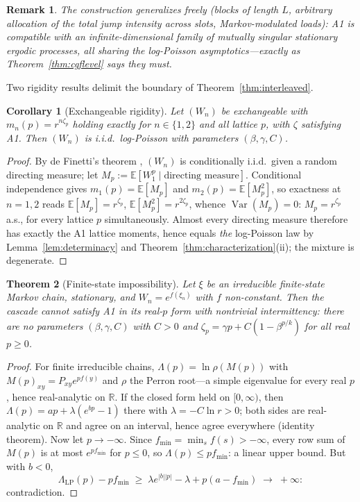 \documentclass[pdflatex,sn-mathphys-num]{sn-jnl}
\theoremstyle{thmstyleone}
\newtheorem{theorem}{Theorem}
\newtheorem{corollary}[theorem]{Corollary}
\theoremstyle{thmstyletwo}
\newtheorem*{remark}{Remark}
\theoremstyle{thmstylethree}
\DeclareMathOperator{\Var}{Var}
\begin{document}
\begin{remark}
The construction generalizes freely (blocks of length $L$, arbitrary
allocation of the total jump intensity across slots,
Markov-modulated loads): A1 is compatible with an
infinite-dimensional family of mutually singular stationary ergodic
processes, all sharing the log-Poisson asymptotics---exactly as
Theorem~\ref{thm:cgflevel} says they must.
\end{remark}

Two rigidity results delimit the boundary of
Theorem~\ref{thm:interleaved}.

\begin{corollary}[Exchangeable rigidity]\label{cor:exch}
Let $(W_n)$ be exchangeable with $m_n(p) = r^{n\zeta_p}$ holding
exactly for $n \in \{1,2\}$ and all lattice $p$, with $\zeta$
satisfying A1.  Then $(W_n)$ is i.i.d.\ log-Poisson with parameters
$(\beta, \gamma, C)$.
\end{corollary}

\begin{proof}
By de Finetti's theorem \cite{Kal02}, $(W_n)$ is conditionally
i.i.d.\ given a random directing measure; let $M_p :=
\mathbb{E}[W_1^p \mid \text{directing measure}]$.  Conditional
independence gives $m_1(p) = \mathbb{E}[M_p]$ and $m_2(p) =
\mathbb{E}[M_p^2]$, so exactness at $n = 1,2$ reads
$\mathbb{E}[M_p] = r^{\zeta_p}$, $\mathbb{E}[M_p^2] =
r^{2\zeta_p}$, whence $\Var(M_p) = 0$: $M_p = r^{\zeta_p}$ a.s., for
every lattice $p$ simultaneously.  Almost every directing measure
therefore has exactly the A1 lattice moments, hence equals
\emph{the} log-Poisson law by Lemma~\ref{lem:determinacy} and
Theorem~\ref{thm:characterization}(ii); the mixture is degenerate.
\end{proof}

\begin{theorem}[Finite-state impossibility]\label{thm:finitestate}
Let $\xi$ be an irreducible finite-state Markov chain, stationary,
and $W_n = e^{f(\xi_n)}$ with $f$ non-constant.  Then the cascade
cannot satisfy A1 in its real-$p$ form with nontrivial
intermittency: there are no parameters $(\beta, \gamma, C)$ with
$C > 0$ and $\zeta_p = \gamma p + C(1-\beta^{p/k})$ for all real
$p \ge 0$.
\end{theorem}

\begin{proof}
For finite irreducible chains, $\Lambda(p) = \ln\rho(M(p))$ with
$M(p)_{xy} = P_{xy}e^{pf(y)}$ and $\rho$ the Perron root---a simple
eigenvalue for every real $p$, hence real-analytic on $\mathbb{R}$.
If the closed form held on $[0,\infty)$, then $\Lambda(p) = ap +
\lambda(e^{bp}-1)$ there with $\lambda = -C\ln r > 0$; both sides
are real-analytic on $\mathbb{R}$ and agree on an interval, hence
agree everywhere (identity theorem).  Now let $p \to -\infty$.
Since $f_{\min} = \min_s f(s) > -\infty$, every row sum of $M(p)$
is at most $e^{pf_{\min}}$ for $p \le 0$, so $\Lambda(p) \le
pf_{\min}$: a linear upper bound.  But with $b < 0$,
\[
  \Lambda_{\mathrm{LP}}(p) - pf_{\min}
  \;\ge\; \lambda e^{|b||p|} - \lambda + p(a - f_{\min})
  \;\longrightarrow\; +\infty :
\]
contradiction.
\end{proof}
\end{document}
